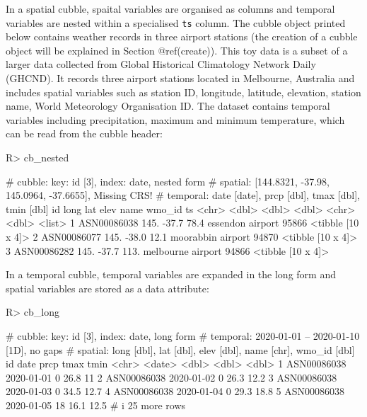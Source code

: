 \documentclass[
]{jss}
\begin{document}
In a spatial cubble, spaital variables are organised as columns and
temporal variables are nested within a specialised \texttt{ts} column.
The cubble object printed below contains weather records in three
airport stations (the creation of a cubble object will be explained in
Section @ref(create)). This toy data is a subset of a larger data
 collected from Global Historical Climatology Network
Daily (GHCND). It records three airport stations located in Melbourne,
Australia and includes spatial variables such as station ID, longitude,
latitude, elevation, station name, World Meteorology Organisation ID.
The dataset contains temporal variables including precipitation, maximum
and minimum temperature, which can be read from the cubble header:

\begin{CodeChunk}
\begin{CodeInput}
R> cb_nested
\end{CodeInput}
\begin{CodeOutput}
# cubble:   key: id [3], index: date, nested form
# spatial:  [144.8321, -37.98, 145.0964, -37.6655], Missing CRS!
# temporal: date [date], prcp [dbl], tmax [dbl], tmin [dbl]
  id           long   lat  elev name              wmo_id ts               
  <chr>       <dbl> <dbl> <dbl> <chr>              <dbl> <list>           
1 ASN00086038  145. -37.7  78.4 essendon airport   95866 <tibble [10 x 4]>
2 ASN00086077  145. -38.0  12.1 moorabbin airport  94870 <tibble [10 x 4]>
3 ASN00086282  145. -37.7 113.  melbourne airport  94866 <tibble [10 x 4]>
\end{CodeOutput}
\end{CodeChunk}

In a temporal cubble, temporal variables are expanded in the long form
and spatial variables are stored as a data attribute:

\begin{CodeChunk}
\begin{CodeInput}
R> cb_long
\end{CodeInput}
\begin{CodeOutput}
# cubble:   key: id [3], index: date, long form
# temporal: 2020-01-01 -- 2020-01-10 [1D], no gaps
# spatial:  long [dbl], lat [dbl], elev [dbl], name [chr], wmo_id [dbl]
  id          date        prcp  tmax  tmin
  <chr>       <date>     <dbl> <dbl> <dbl>
1 ASN00086038 2020-01-01     0  26.8  11  
2 ASN00086038 2020-01-02     0  26.3  12.2
3 ASN00086038 2020-01-03     0  34.5  12.7
4 ASN00086038 2020-01-04     0  29.3  18.8
5 ASN00086038 2020-01-05    18  16.1  12.5
# i 25 more rows
\end{CodeOutput}
\end{CodeChunk}
\end{document}
